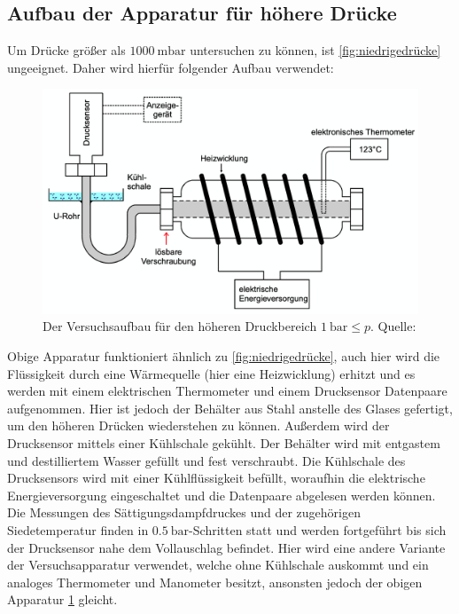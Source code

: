     \subsection{Aufbau der Apparatur für höhere Drücke}
    Um Drücke größer als $\SI{1000}{\milli\bar}$ untersuchen zu können, ist \ref{fig:niedrigedrücke} ungeeignet. Daher wird
    hierfür folgender Aufbau verwendet:
    \begin{figure}
      \centering
      \includegraphics[scale=0.4]{Content/apparaturhohe.png}
      \caption{Der Versuchsaufbau für den höheren Druckbereich $\SI{1}{\bar} \leq p $. Quelle: \cite{AP01}}
      \label{fig:hohedrücke}
    \end{figure}
    Obige Apparatur funktioniert ähnlich zu \ref{fig:niedrigedrücke}, auch hier wird die Flüssigkeit durch eine Wärmequelle
    (hier eine Heizwicklung) erhitzt und es werden mit einem elektrischen Thermometer und einem Drucksensor Datenpaare
    aufgenommen. Hier ist jedoch der Behälter aus Stahl anstelle des Glases gefertigt, um den höheren Drücken wiederstehen zu
    können. Außerdem wird der Drucksensor mittels einer Kühlschale gekühlt. Der Behälter wird mit entgastem und destilliertem
    Wasser gefüllt und fest verschraubt. Die Kühlschale des Drucksensors wird mit einer Kühlflüssigkeit befüllt, woraufhin die
    elektrische Energieversorgung eingeschaltet und die Datenpaare abgelesen werden können. Die Messungen des
    Sättigungsdampfdruckes und der zugehörigen Siedetemperatur finden in $\SI{0.5}{\bar}$-Schritten statt und werden fortgeführt
    bis sich der Drucksensor nahe dem Vollauschlag befindet. Hier wird eine andere Variante der Versuchsapparatur verwendet,
    welche ohne Kühlschale auskommt und ein analoges Thermometer und Manometer besitzt, ansonsten jedoch der obigen Apparatur
    \ref{fig:hohedrücke} gleicht.
\label{sec:Durchführung}
